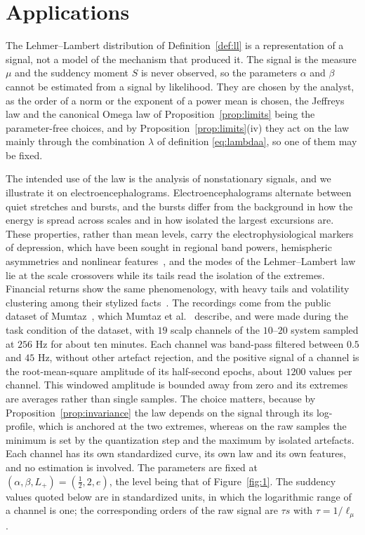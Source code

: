 \documentclass[sn-mathphys-num]{sn-jnl}\newcommand{\SNJNL}{}
\theoremstyle{thmstyleone}
\theoremstyle{thmstyletwo}
\theoremstyle{thmstylethree}
\theoremstyle{thmstyleone}
\begin{document}
	\section{Applications}\label{sec:estimation}
	
	The Lehmer--Lambert distribution of Definition~\ref{def:ll} is a
	representation of a signal, not a model of the mechanism that
	produced it. The signal is the measure $\mu$ and the suddency moment
	$S$ is never observed, so the parameters $\alpha$ and $\beta$ cannot
	be estimated from a signal by likelihood. They are chosen by the
	analyst, as the order of a norm or the exponent of a power mean is
	chosen, the Jeffreys law and the canonical Omega law of
	Proposition~\ref{prop:limits} being the parameter-free choices, and
	by Proposition~\ref{prop:limits}(iv) they act on the law mainly
	through the combination $\lambda$ of definition \eqref{eq:lambdaa},
	so one of them may be fixed.
	
	The intended use of the law is the analysis of nonstationary
	signals, and we illustrate it on electroencephalograms.
	Electroencephalograms alternate between quiet stretches and bursts,
	and the bursts differ from the background in how the energy is
	spread across scales and in how isolated the largest excursions
	are. These properties, rather than mean levels, carry the
	electrophysiological markers of depression, which have been sought
	in regional band powers, hemispheric asymmetries and nonlinear
	features~\cite{henriques1991,heller1993,mumtaz2017,delatorre2017},
	and the modes of the Lehmer--Lambert law lie at the scale
	crossovers while its tails read the isolation of the extremes.
	Financial returns show the same phenomenology, with heavy tails and
	volatility clustering among their stylized
	facts~\cite{cont2001,ataei2021,ataei2025a,ataei2020,ataei2025b}.
	The recordings come from the public dataset of
	Mumtaz~\cite{mumtaz2016}, which Mumtaz et al.~\cite{mumtaz2017}
	describe, and were made during the task condition of the dataset,
	with $19$ scalp channels of the $10$--$20$ system sampled at $256$
	Hz for about ten minutes. Each channel was band-pass filtered
	between $0.5$ and $45$ Hz, without other artefact rejection, and the
	positive signal of a channel is the root-mean-square amplitude of
	its half-second epochs, about $1200$ values per channel. This
	windowed amplitude is bounded away from zero and its extremes are
	averages rather than single samples. The choice matters, because by
	Proposition~\ref{prop:invariance} the law depends on the signal
	through its log-profile, which is anchored at the two extremes,
	whereas on the raw samples the minimum is set by the quantization
	step and the maximum by isolated artefacts. Each channel has its own
	standardized curve, its own law and its own features, and no
	estimation is involved. The parameters are fixed at
	$(\alpha,\beta,L_+)=(\tfrac12,2,e)$, the level being that of
	Figure~\ref{fig:1}. The suddency values quoted below are in
	standardized units, in which the logarithmic range of a channel is
	one; the corresponding orders of the raw signal are $\tau s$ with
	$\tau=1/\ell_\mu$.
	
\end{document}
